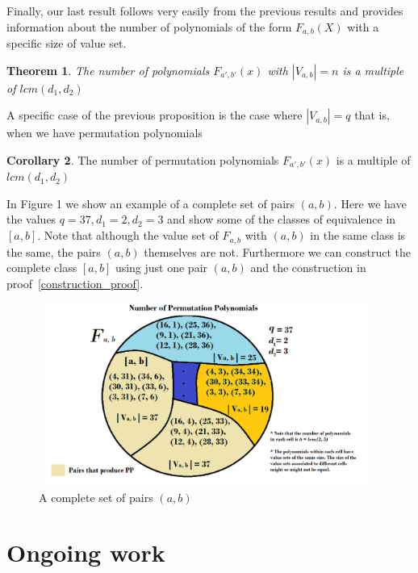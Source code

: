\documentclass{article}
\newtheorem{theorem}{Theorem}[section]
\theoremstyle{definition}
\newtheorem{corollary}[theorem]{Corollary}
\theoremstyle{remark}
\numberwithin{equation}{section}
\begin{document}
Finally, our last result follows very easily from the previous results and provides information about the number of polynomials of the form $F_{a,b}(X)$ with a specific size of value set.

\begin{theorem}

  The number of polynomials $F_{a', b'}(x)$ with $|V_{a, b}| = n$ is a multiple of $lcm(d_1,d_2)$

\end{theorem}
    
A specific case of the previous proposition is the case where $|V_{a, b}| = q$ that is, when we have permutation polynomials

\begin{corollary}
  The number of permutation polynomials $F_{a', b'}(x)$ is a multiple of $lcm(d_1,d_2)$  
\end{corollary}

In Figure 1 we show an example of a complete set of pairs $(a,b)$. Here we have the values $q=37, d_1=2, d_2=3$ and show some of the classes of equivalence in $[a,b]$. Note that although the value set of $F_{a,b}$ with $(a,b)$ in the same class is the same, the pairs $(a,b)$ themselves are not. Furthermore we can construct the complete class $[a,b]$ using just one pair $(a,b)$ and the construction in proof~\ref{construction_proof}.

\begin{figure}
  \includegraphics[width=11cm, height=6cm]{clases}
  \caption{A complete set of pairs $(a,b)$}
\end{figure}


\section{Ongoing work}    
    
\end{document}
